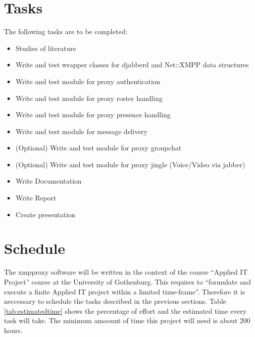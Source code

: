 \documentclass[a4paper,10pt,numbers=noendperiod]{scrartcl}
\begin{document}
\section{Tasks}
The following tasks are to be completed:
\begin{itemize}
	\item Studies of literature
	\item Write and test wrapper classes for djabberd and Net::XMPP data structures 
	\item Write and test module for proxy authentication
	\item Write and test module for proxy roster handling
	\item Write and test module for proxy presence handling 
	\item Write and test module for message delivery 
	\item (Optional) Write and test module for proxy groupchat
	\item (Optional) Write and test module for proxy jingle (Voice/Video via jabber)	
	\item Write Documentation	
	\item Write Report
	\item Create presentation
\end{itemize}


\section{Schedule}
The xmpproxy software will be written in the context of the course ``Applied IT Project'' course at the University of Gothenburg. This requires to ``formulate and execute a finite Applied IT project within a limited time-frame''. 
Therefore it is neccessary to schedule the tasks described in the previous sections. 
Table \ref{tab:estimatedtime} shows the percentage of effort and the estimated time every task will take. The minimum amoount of time this project will need is about 200 hours.
\end{document}
